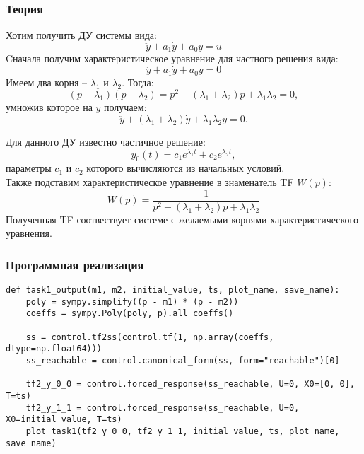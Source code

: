 \documentclass[16pt]{article}
\begin{document}
\subsubsection{Теория}
Хотим получить ДУ системы вида:
\[\ddot{y} + a_1\dot{y} + a_0y = u\]
Cначала получим характеристическое уравнение для частного решения вида:
\[\ddot{y} + a_1\dot{y} + a_0y = 0\]
Имеем два корня -- \(\lambda_1\) и \(\lambda_2\). Тогда:
\[ (p - \lambda_1)(p-\lambda_2) = p^2 - (\lambda_1 + \lambda_2)p + \lambda_1\lambda_2 = 0,\]
умножив которое на \(y\) получаем:
\[\ddot{y} + (\lambda_1 + \lambda_2)\dot{y} + \lambda_1\lambda_2y = 0.\]

Для данного ДУ известно частичное решение:
\[ y_{0}(t) = c_1 e^{\lambda_1 t} + c_2 e^{\lambda_2 t},\]
параметры \(c_1\) и \(c_2\) которого вычисляются из начальных условий.
\\
Также подставим характеристическое уравнение в знаменатель TF \(W(p)\):
\[W(p) = \frac{1}{p^2 - (\lambda_1 + \lambda_2)p + \lambda_1\lambda_2}\]
Полученная TF соотвествует системе с желаемыми корнями характеристического уравнения.
\subsubsection{Программная реализация}
\begin{verbatim}
def task1_output(m1, m2, initial_value, ts, plot_name, save_name):
    poly = sympy.simplify((p - m1) * (p - m2))
    coeffs = sympy.Poly(poly, p).all_coeffs()
    
    ss = control.tf2ss(control.tf(1, np.array(coeffs, dtype=np.float64)))
    ss_reachable = control.canonical_form(ss, form="reachable")[0]

    tf2_y_0_0 = control.forced_response(ss_reachable, U=0, X0=[0, 0], T=ts)
    tf2_y_1_1 = control.forced_response(ss_reachable, U=0, X0=initial_value, T=ts)
    plot_task1(tf2_y_0_0, tf2_y_1_1, initial_value, ts, plot_name, save_name)
\end{verbatim}
\end{document}
